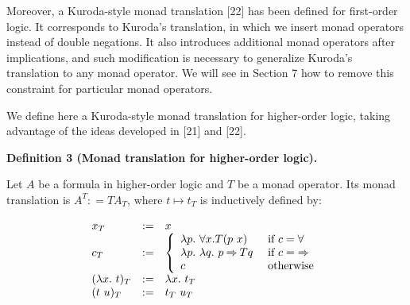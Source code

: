  
 
Moreover, a Kuroda-style monad translation [22] has been defined for first-order logic. It corresponds to Kuroda’s translation, in which we insert monad operators instead of double negations. It also introduces additional monad operators after implications, and such modification is necessary to generalize Kuroda’s translation to any monad operator. We will see in Section 7 how to remove this constraint for particular monad operators.\par
 
 
 
We define here a Kuroda-style monad translation for higher-order logic, taking advantage of the ideas developed in [21] and [22].\par
 
 
 
\par\medskip\noindent\textbf{Definition 3 (Monad translation for higher-order logic).}\par
 
 
Let $A$ be a formula in higher-order logic and $T$ be a monad operator. Its monad translation is $A^{T}\mathrel{\mathop{:}}=TA_{T}$, where $t\mapsto t_{T}$ is inductively defined by:\par
  
\par  \quad  \[\begin{array}[]{lll}x_{T}&\mathrel{\mathop{:}}=&x\\
c_{T}&\mathrel{\mathop{:}}=&\left\{\begin{array}[]{ll}\lambda p.\leavevmode\nobreak\ {\forall}x.T(p\leavevmode\nobreak\ x)&\text{ if $c={\forall}$}\\
\lambda p.\leavevmode\nobreak\ \lambda q.\leavevmode\nobreak\ p\mathbin{\Rightarrow}Tq&\text{ if $c=\mathbin{\Rightarrow}$}\\
c&\text{ otherwise}\\
\end{array}\right.\\
(\lambda x.\leavevmode\nobreak\ t)_{T}&\mathrel{\mathop{:}}=&\lambda x.\leavevmode\nobreak\ t_{T}\\
(t\leavevmode\nobreak\ u)_{T}&\mathrel{\mathop{:}}=&t_{T}\leavevmode\nobreak\ u_{T}\\
\end{array}\]\quad  \quad  
  
